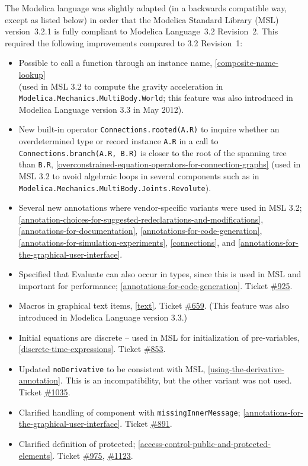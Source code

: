 The Modelica language was slightly adapted (in a backwards compatible way, except as listed below) in order that the Modelica Standard Library (MSL) version~3.2.1 is fully compliant to Modelica
Language~3.2 Revision~2.  This required the following improvements compared to 3.2 Revision~1:
\begin{itemize}
\item
  Possible to call a function through an instance name, \cref{composite-name-lookup}\\
  (used in MSL 3.2 to compute the gravity acceleration in \lstinline!Modelica.Mechanics.MultiBody.World!; this feature was also introduced in Modelica Language version 3.3 in May 2012).
\item
  New built-in operator \lstinline!Connections.rooted(A.R)! to inquire whether an overdetermined type or record instance \lstinline!A.R! in a call to \lstinline!Connections.branch(A.R, B.R)! is closer to the root of the spanning tree than \lstinline!B.R!, \cref{overconstrained-equation-operators-for-connection-graphs} (used in MSL 3.2 to avoid algebraic loops in several components such as in \lstinline!Modelica.Mechanics.MultiBody.Joints.Revolute!).
\item
  Several new annotations where vendor-specific variants were used in
  MSL 3.2; \cref{annotation-choices-for-suggested-redeclarations-and-modifications},
  \cref{annotations-for-documentation}, \cref{annotations-for-code-generation},
  \cref{annotations-for-simulation-experiments}, \cref{connections}, and \cref{annotations-for-the-graphical-user-interface}.
\item
  Specified that Evaluate can also occur in types, since this is used in
  MSL and important for performance; \cref{annotations-for-code-generation}. Ticket
  \href{https://github.com/modelica/ModelicaSpecification/issues/925}{\#925}.
\item
  Macros in graphical text items, \cref{text}. Ticket
  \href{https://github.com/modelica/ModelicaSpecification/issues/659}{\#659}. (This
  feature was also introduced in Modelica Language version 3.3.)
\item
  Initial equations are discrete -- used in MSL for initialization of pre-variables, \cref{discrete-time-expressions}.
  Ticket \href{https://github.com/modelica/ModelicaSpecification/issues/853}{\#853}.
\item
  Updated \lstinline!noDerivative! to be consistent with MSL, \cref{using-the-derivative-annotation}.  This is an incompatibility, but the other variant was not used.
  Ticket \href{https://github.com/modelica/ModelicaSpecification/issues/1035}{\#1035}.
\item
  Clarified handling of component with \lstinline!missingInnerMessage!; \cref{annotations-for-the-graphical-user-interface}.
  Ticket \href{https://github.com/modelica/ModelicaSpecification/issues/891}{\#891}.
\item
  Clarified definition of protected; \cref{access-control-public-and-protected-elements}. Ticket
  \href{https://github.com/modelica/ModelicaSpecification/issues/975}{\#975},
  \href{https://github.com/modelica/ModelicaSpecification/issues/1123}{\#1123}.
\end{itemize}

